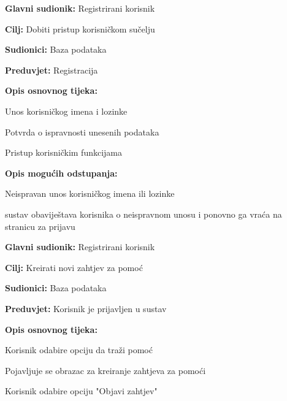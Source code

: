\noindent {}
\begin{packed_item}
	\item \textbf{Glavni sudionik: }Registrirani korisnik
	\item  \textbf{Cilj:} Dobiti pristup korisničkom sučelju
	\item  \textbf{Sudionici:} Baza podataka
	\item  \textbf{Preduvjet:} Registracija
	\item  \textbf{Opis osnovnog tijeka:}
	\item[] \begin{packed_enum}
		\item Unos korisničkog imena i lozinke
		\item Potvrda o ispravnosti unesenih podataka
		\item Pristup korisničkim funkcijama
	\end{packed_enum}
	\item  \textbf{Opis mogućih odstupanja:}
	\item[] \begin{packed_item}
		\item[1.a] Neispravan unos korisničkog imena ili lozinke
		\item[] \begin{packed_enum}
			\item sustav obaviještava korisnika o neispravnom unosu i ponovno ga vraća na stranicu za prijavu
		\end{packed_enum}
	\end{packed_item}
\end{packed_item}
\newpage
\noindent {}
\begin{packed_item}
	\item \textbf{Glavni sudionik: } Registrirani korisnik
	\item  \textbf{Cilj:} Kreirati novi zahtjev za pomoć
	\item  \textbf{Sudionici:} Baza podataka
	\item  \textbf{Preduvjet:} Korisnik je prijavljen u sustav
	\item  \textbf{Opis osnovnog tijeka:}
	\item[] \begin{packed_enum}
		\item Korisnik odabire opciju da traži pomoć
		\item Pojavljuje se obrazac za kreiranje zahtjeva za pomoći
		\item Korisnik odabire opciju "Objavi zahtjev"
	\end{packed_enum}
\end{packed_item}

